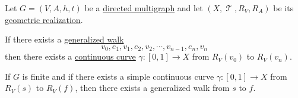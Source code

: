 \begin{proposition}\label{thm:directed_multigraph_geometric_realization_paths}
  Let \( G = (V, A, h, t) \) be a \hyperref[def:directed_multigraph]{directed multigraph} and let \( (X, \mscrT, R_V, R_A) \) be its \hyperref[def:graph_geometric_realization]{geometric realization}.

  \begin{thmenum}
     If there exists a \hyperref[def:graph_walk/generalized]{generalized walk}
    \begin{equation}\label{eq:thm:directed_multigraph_geometric_realization_paths/graph_to_realization/graph}
      v_0, e_1, v_1, e_2, v_2, \cdots, v_{n-1}, e_n, v_n
    \end{equation}
    then there exists a \hyperref[def:parametric_curve]{continuous curve} \( \gamma: [0, 1] \to X \) from \( R_V(v_0) \) to \( R_V(v_n) \).

     If \( G \) is finite and if there exists a simple continuous curve \( \gamma: [0, 1] \to X \) from \( R_V(s) \) to \( R_V(f) \), then there exists a generalized walk from \( s \) to \( f \).
  \end{thmenum}
\end{proposition}
